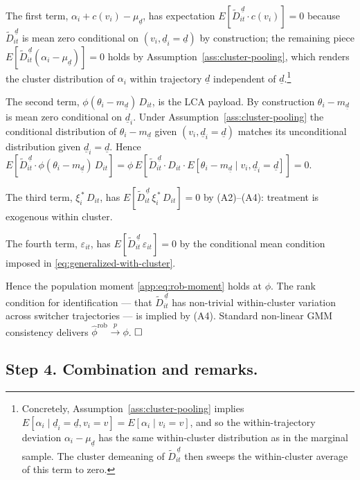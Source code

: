 The first term, $\alpha_i + c(v_i) - \mu_{\underline d}$, has expectation $E[\tilde D_{it}^{\,\underline d}\cdot c(v_i)] = 0$ because $\tilde D_{it}^{\,\underline d}$ is mean zero conditional on $(v_i, \underline d_i = \underline d)$ by construction; the remaining piece $E[\tilde D_{it}^{\,\underline d}(\alpha_i - \mu_{\underline d})] = 0$ holds by Assumption~\ref{ass:cluster-pooling}, which renders the cluster distribution of $\alpha_i$ within trajectory $\underline d$ independent of $\underline d$.\footnote{Concretely, Assumption~\ref{ass:cluster-pooling} implies $E[\alpha_i \mid \underline d_i = \underline d, v_i = v] = E[\alpha_i \mid v_i = v]$, and so the within-trajectory deviation $\alpha_i - \mu_{\underline d}$ has the same within-cluster distribution as in the marginal sample. The cluster demeaning of $\tilde D_{it}^{\,\underline d}$ then sweeps the within-cluster average of this term to zero.}

The second term, $\phi(\theta_i - m_{\underline d})\,D_{it}$, is the LCA payload.
By construction $\theta_i - m_{\underline d}$ is mean zero conditional on $\underline d_i$.
Under Assumption~\ref{ass:cluster-pooling} the conditional distribution of $\theta_i - m_{\underline d}$ given $(v_i, \underline d_i = \underline d)$ matches its unconditional distribution given $\underline d_i = \underline d$.
Hence $E[\tilde D_{it}^{\,\underline d}\cdot \phi(\theta_i - m_{\underline d})\,D_{it}] = \phi\,E[\tilde D_{it}^{\,\underline d}\cdot D_{it}\cdot E[\theta_i - m_{\underline d} \mid v_i,\underline d_i = \underline d]] = 0$.

The third term, $\xi_i^{\,*}\,D_{it}$, has $E[\tilde D_{it}^{\,\underline d}\,\xi_i^{\,*}\,D_{it}] = 0$ by (A2)--(A4): treatment is exogenous within cluster.

The fourth term, $\varepsilon_{it}$, has $E[\tilde D_{it}^{\,\underline d}\,\varepsilon_{it}] = 0$ by the conditional mean condition imposed in \eqref{eq:generalized-with-cluster}.

Hence the population moment \eqref{app:eq:rob-moment} holds at $\phi$.
The rank condition for identification --- that $\tilde D_{it}^{\,\underline d}$ has non-trivial within-cluster variation across switcher trajectories --- is implied by (A4).
Standard non-linear GMM consistency \citep{hansen1982large} delivers $\hat\phi^{\mathrm{rob}} \xrightarrow{p} \phi$. $\hfill\square$

\subsection*{Step 4.  Combination and remarks.}

